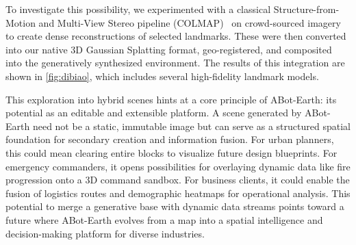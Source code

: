 To investigate this possibility, we experimented with a classical Structure-from-Motion and Multi-View Stereo pipeline (COLMAP)~\cite{schoenberger2016sfm,schoenberger2016mvs} on crowd-sourced imagery to create dense reconstructions of selected landmarks. These were then converted into our native 3D Gaussian Splatting format, geo-registered, and composited into the generatively synthesized environment. The results of this integration are shown in \cref{fig:dibiao}, which includes several high-fidelity landmark models.


This exploration into hybrid scenes hints at a core principle of ABot-Earth: its potential as an editable and extensible platform. A scene generated by ABot-Earth need not be a static, immutable image but can serve as a structured spatial foundation for secondary creation and information fusion. For urban planners, this could mean clearing entire blocks to visualize future design blueprints. For emergency commanders, it opens possibilities for overlaying dynamic data like fire progression onto a 3D command sandbox. For business clients, it could enable the fusion of logistics routes and demographic heatmaps for operational analysis. This potential to merge a generative base with dynamic data streams points toward a future where ABot-Earth evolves from a map into a spatial intelligence and decision-making platform for diverse industries.























